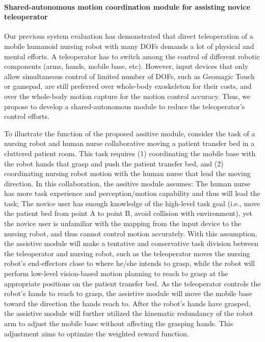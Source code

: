 \documentclass[letterpaper, 11 pt, onecolumn]{article}
\begin{document}
\paragraph*{Shared-autonomous motion coordination module for assisting novice teleoperator} Our previous system evaluation has demonstrated that direct teleoperation of a mobile humanoid nursing robot with many DOFs demands a lot of physical and mental efforts. A teleoperator has to switch among the control of different robotic components (arms, hands, mobile base, etc). However, input devices that only allow simultaneous control of limited number of DOFs, such as Geomagic Touch or gamepad, are still preferred over whole-body exoskeleton for their costs, and over the whole-body motion capture for the motion control accuracy. Thus, we propose to develop a shared-autonomous module to reduce the teleoperator's control efforts.


To illustrate the function of the proposed assitive module, consider the task of a nursing robot and human nurse collaborative moving a patient transfer bed in a cluttered patient room. This task requires (1) coordinating the mobile base with the robot hands that grasp and push the patient transfer bed, and (2) coordinating nursing robot motion with the human nurse that lead the moving direction. In this collaboration, the assitive module assumes: The human nurse has more task experience and perception/motion capability and thus will lead the task; The novice user has enough knowledge of the high-level task goal (i.e., move the patient bed from point A to point B, avoid collision with environment), yet the novice user is unfamiliar with the mapping from the input device to the nursing robot, and thus cannot control motion accurately. With this assumption, the assistive module will make a tentative and conservative task division between the teleoperator and nursing robot, such as the teleoperator moves the nursing robot's end-effectors close to where he/she intends to grasp, while the robot will perform low-level vision-based motion planning to reach to grasp at the appropriate positions on the patient transfer bed. As the teleoperator controls the robot's hands to reach to grasp, the assistive module will move the mobile base toward the direction the hands reach to. After the robot's hands have grasped, the assistive module will further utilized the kinematic redundancy of the robot arm to adjust the mobile base without affecting the grasping hands. This adjustment aims to optimize the weighted reward function.
\end{document}

